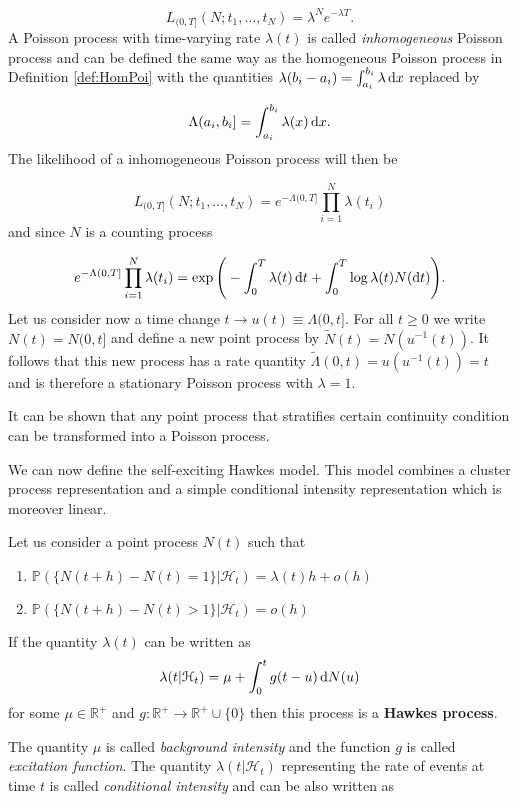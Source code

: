 \begin{equation*}
    L_{(0, T]}(N;t_1, \dots, t_N) = \lambda^N e^{-\lambda T}.
\end{equation*}
A Poisson process with time-varying rate $\lambda(t)$ is called \textit{inhomogeneous} Poisson process and can be defined the same way as the homogeneous Poisson process in Definition \ref{def:HomPoi} with the quantities $\lambda(b_i - a_i) = \int_{a_i}^{b_i} \lambda \operatorname{d}\!{x}$ replaced by

\begin{equation*}
    \Lambda(a_i, b_i] = \int_{a_i}^{b_i} \lambda(x) \operatorname{d}\!{x}.
\end{equation*}
The likelihood of a inhomogeneous Poisson process will then be

\begin{equation} \label{eq:LikInhPoiPro}
    L_{(0, T]}(N;t_1, \dots, t_N) = e^{-\Lambda(0, T]}\prod_{i=1}^N \lambda(t_i)
\end{equation}
and since $N$ is a counting process

\begin{equation*}
    e^{-\Lambda(0, T]}\prod_{i=1}^N \lambda(t_i) = \exp \Bigg( - \int_0^T \lambda(t)\operatorname{d}\!{t} + \int_0^T \log \lambda(t) N (\operatorname{d}\!{t}) \Bigg).
\end{equation*}
Let us consider now  a time change $t \rightarrow u(t) \equiv \Lambda(0, t]$. For all $t \geq 0$ we write $N(t) = N (0, t]$ and define a new point process by $\tilde{N}(t) = N(u^{-1}(t))$. It follows that this new process has a rate quantity $\tilde{\Lambda}(0, t) = u(u^{-1}(t)) = t$ and is therefore a stationary Poisson process with $\lambda = 1$.

It can be shown that any point process that stratifies certain continuity condition can be transformed into a Poisson  process. 

We can now define the self-exciting Hawkes model. This model combines a cluster process representation and a simple conditional intensity representation which is moreover linear.

\begin{definition}\label{def:Hawkes}
    Let us consider a point process $N(t)$ such that
    \begin{enumerate}[label=(\roman*)]
        \item $\mathbb{P}(\{ N(t+h) - N(t) = 1 \} | \mathcal{H}_t) = \lambda(t)h + o(h)$
        \item $\mathbb{P}(\{ N(t+h) - N(t) > 1 \} | \mathcal{H}_t) = o(h)$
    \end{enumerate}
    If the quantity $\lambda(t)$ can be written as
    \begin{equation*}
        \lambda(t | \mathcal{H}_t) = \mu + \int_{0}^t g(t - u) \operatorname{d}\!{N}(u)
    \end{equation*}
    for some $\mu \in \mathbb{R^+}$ and $g : \mathbb{R^+} \rightarrow \mathbb{R^+} \cup \{0\}$ then this process is a \textbf{Hawkes process}.
\end{definition}
The quantity $\mu$ is called \textit{background intensity} and the function $g$ is called \textit{excitation function}. The quantity $\lambda(t | \mathcal{H}_t)$ representing the rate of events at time $t$ is called \textit{conditional intensity} and can be also written as


